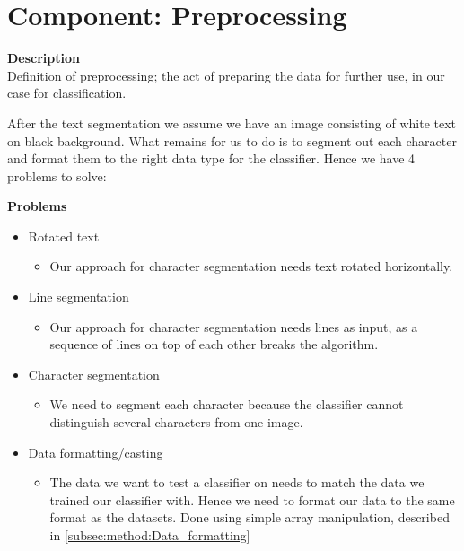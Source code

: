 \documentclass[Report.tex]{subfiles}
\begin{document}
\section{Component: Preprocessing}
\label{Method:Preprocessing}
\begin{flushleft}
  \textbf{Description} \\
  Definition of preprocessing; the act of preparing the data for further use,
  in our case for classification. \par
  After the text segmentation we assume we have an image consisting of white text on black background. What remains for us to do is to segment out each character and format them to the right data type for the classifier. Hence we have 4 problems to solve:
\end{flushleft}

\begin{flushleft}
  \textbf{Problems}
  \begin{itemize}
    \item{Rotated text}
    \begin{itemize}
      \item{Our approach for character segmentation needs text rotated horizontally.}
    \end{itemize}
    \item{Line segmentation}
    \begin{itemize}
      \item{Our approach for character segmentation needs lines as input, as a sequence of lines on top of each other breaks the algorithm.}
    \end{itemize}
    \item{Character segmentation}
    \begin{itemize}
      \item{We need to segment each character because the classifier cannot distinguish several characters from one image.}
    \end{itemize}
    \item{Data formatting/casting}
    \begin{itemize}
      \item{The data we want to test a classifier on needs to match the data we trained our classifier with. Hence we need to format our data to the same format as the datasets.  Done using simple array manipulation, described in \ref{subsec:method:Data_formatting}}
    \end{itemize}
  \end{itemize}
\end{flushleft}
\end{document}
